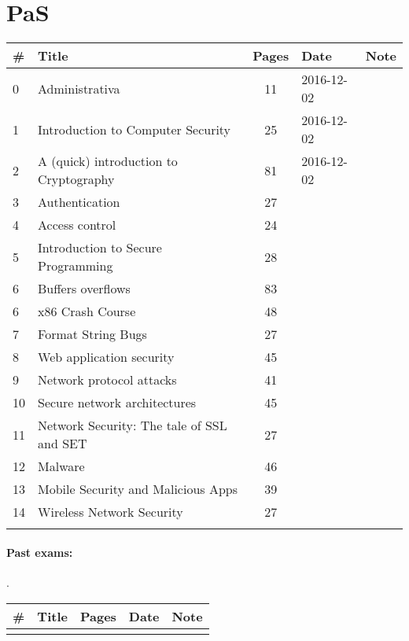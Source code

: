 \documentclass[a4paper,12pt]{article} %
\begin{document}
\section{PaS}
\begin{tabularx}{\textwidth}{|l|X|c|l|c|}
	\hline
	\# & Title & Pages & Date & Note \\
	\hline
	0 & Administrativa & 11 & 2016-12-02 &  \\
	\hline
	1 & Introduction to Computer Security & 25 & 2016-12-02 &  \\
	\hline
	2 & A (quick) introduction to Cryptography & 81 & 2016-12-02 &  \\
	\hline
	3 & Authentication & 27 &  &  \\
	\hline
	4 & Access control & 24 &  &  \\
	\hline
	5 & Introduction to Secure Programming & 28 &  &  \\
	\hline
	6 & Buffers overflows & 83 &  &  \\
	\hline
	6 & x86 Crash Course & 48 &  &  \\
	\hline
	7 & Format String Bugs & 27 &  &  \\
	\hline
	8 & Web application security & 45 &  &  \\
	\hline
	9 & Network protocol attacks & 41 &  &  \\
	\hline
	10 & Secure network architectures & 45 &  &  \\
	\hline
	11 & Network Security: The tale of SSL and SET & 27 &  &  \\
	\hline
	12 & Malware & 46 &  &  \\
	\hline
	13 & Mobile Security and Malicious Apps & 39 &  &  \\
	\hline
	14 & Wireless Network Security & 27 &  &  \\
	\hline
	&  &  &  &  \\
	\hline
\end{tabularx}

\paragraph{Past exams:}.\\
\begin{tabularx}{\textwidth}{|l|X|c|l|c|}
	\hline
	\# & Title & Pages & Date & Note \\
	\hline
	&  &  &  &  \\
	\hline
\end{tabularx}

\newpage
\end{document}
